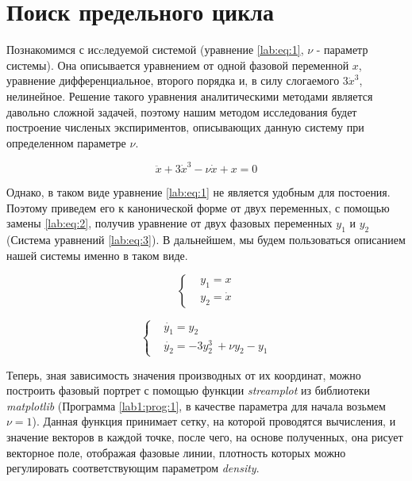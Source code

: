 \chapter{Поиск предельного цикла}

Познакомимся с исcледуемой системой (уравнение \ref{lab:eq:1},
$\nu$ - параметр системы). Она описывается
уравнением от одной фазовой переменной $x$, уравнение дифференциальное, второго 
порядка и, в силу слогаемого $3\dot{x}^3$, нелинейное. Решение такого уравнения 
аналитическими методами является давольно сложной задачей, поэтому нашим
методом исследования будет построение численых экспириментов, описывающих
данную систему при определенном параметре $\nu$.

\begin{equation}\label{lab:eq:1}
  \ddot{x} + 3 \dot{x}^3 - \nu\dot{x} + x = 0
\end{equation}

Однако, в таком виде уравнение \ref{lab:eq:1} не является удобным для постоения.
Поэтому приведем его к канонической форме от двух
переменных, с помощью замены \ref{lab:eq:2}, получив уравнение от двух фазовых
переменных $y_1$ и $y_2$ (Система уравнений \ref{lab:eq:3}). В дальнейшем,
мы будем пользоваться описанием нашей системы именно в таком виде.

\begin{equation}\label{lab:eq:2}
  \begin{cases}
    &y_1 = x \\
    &y_2 = \dot{x}
  \end{cases}
\end{equation}

\begin{equation}\label{lab:eq:3}
  \begin{cases}
    &\dot{y_1} = y_2 \\
    &\dot{y_2} = -3y_2^3\ + \nu y_2 - y_1
  \end{cases}
\end{equation}

Теперь, зная зависимость значения производных от их координат, можно построить
фазовый портрет с помощью функции \textit{streamplot} из библиотеки 
\textit{matplotlib}
(Программа \ref{lab1:prog:1}, в качестве параметра для начала возьмем $\nu = 1$). %
Данная функция принимает сетку, на которой проводятся вычисления, и 
значение векторов в каждой точке, после чего, на основе полученных, она рисует
векторное поле, отображая фазовые линии, плотность которых можно регулировать
соответствующим параметром \textit{density}.

